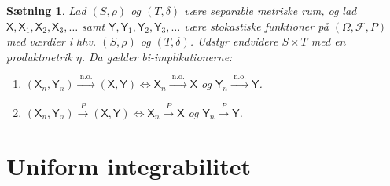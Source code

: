 \documentclass{article}
\newcommand{\1}{\mathbbm{1}}
\newcommand{\X}{\mathsf{X}}
\newcommand{\Y}{\mathsf{Y}}
\newtheorem{proposition}[theorem]{Sætning}
\theoremstyle{boxed}
\begin{document}
\begin{theorem-box}
    \begin{proposition}
        Lad $(S, \rho)$ og $(T, \delta)$ være separable metriske rum, og lad $\X, \X_1, \X_2, \X_3, \ldots$ samt $\Y, \Y_1, \Y_2, \Y_3, \ldots$ være stokastiske funktioner på $(\Omega, \mathcal{F}, P)$ med værdier i hhv. $(S, \rho)$ og $(T, \delta)$.
        Udstyr endvidere $S \times T$ med en produktmetrik $\eta$.
        Da gælder bi-implikationerne:
        \begin{enumerate}
            \item[\textnormal{(i)}] $\left(\X_n, \Y_n\right) \xrightarrow{\text { n.o. }}(\X, \Y) \Longleftrightarrow \X_n \xrightarrow{\text { n.o. }} \X$ og $\Y_n \xrightarrow{\text { n.o. }} \Y$.
            \item[\textnormal{(ii)}] $\left(\X_n, \Y_n\right) \xrightarrow{P}(\X, \Y) \Longleftrightarrow \X_n \xrightarrow{P} \X$ og $\Y_n \xrightarrow{P} \Y$.
        \end{enumerate}
    \end{proposition}
\end{theorem-box}
\section{Uniform integrabilitet}
\end{document}
